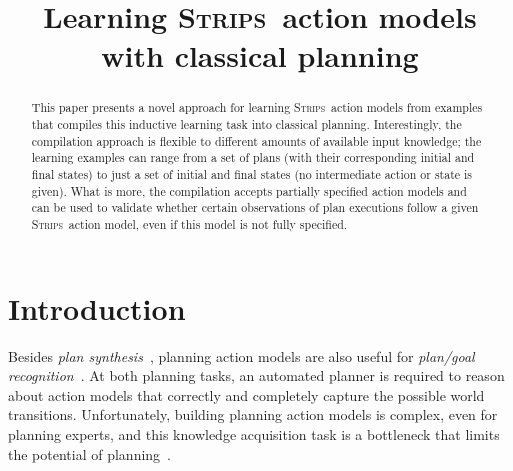 \documentclass[letterpaper]{article} %
\newcommand{\strips}{\textsc{Strips}}     %
\begin{document}
\title{Learning \strips\ action models with classical planning}


\maketitle
\begin{abstract}
This paper presents a novel approach for learning \strips\ action models from examples that compiles this inductive learning task into classical planning. Interestingly, the compilation approach is flexible to different amounts of available input knowledge; the learning examples can range from a set of plans (with their corresponding initial and final states) to just a set of initial and final states (no intermediate action or state is given). What is more, the compilation accepts partially specified action models and can be used to validate whether certain observations of plan executions follow a given \strips\ action model, even if this model is not fully specified.
\end{abstract}


\section{Introduction}
Besides {\em plan synthesis}~\cite{ghallab2004automated,geffner:book:2013}, planning action models are also useful for {\em plan/goal recognition}~\cite{ramirez2012plan}. At both planning tasks, an automated planner is required to reason about action models that correctly and completely capture the possible world transitions. Unfortunately, building planning action models is complex, even for planning experts, and this knowledge acquisition task is a bottleneck that limits the potential of planning~\cite{kambhampati:modellite:AAAI2007}.
\end{document}
